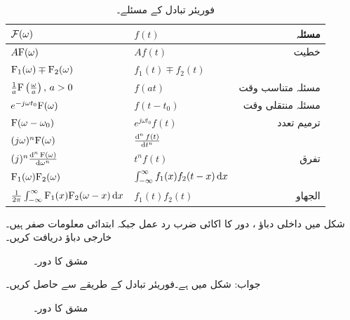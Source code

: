 \begin{table}
\caption{فوریئر تبادل کے مسئلے۔}
\label{جدول_فوریئر_بدل_مسئلے}
\centering
\begin{tabular}{l l r}
$\mathcal{F}(\omega)$ & $f(t)$ & مسئلہ \Bstrut \\ 
\hline
$A{{\textup{F}}}(\omega) $& $Af(t)$ & خطیت\Tstrut \\ [2ex]
${{\textup{F}}}_1(\omega)\mp {\ensuremath{{\textup{F}}}}_2(\omega) $& $f_1(t)\mp f_2(t)$&\\[2ex]
$\frac{1}{a}{{\textup{F}}}\left(\frac{\omega}{a}\right), \, a>0 $& $f(at)$ & مسئلہ متناسب وقت\\[2ex]
$e^{-j\omega t_0} {{\textup{F}}}(\omega)$ &$ f(t-t_0)$ & مسئلہ منتقلی وقت\\[2ex]
${{\textup{F}}}(\omega-\omega_0)$ & $e^{j\omega t_0} f(t)$ & ترمیم تعدد\\[2ex]
$(j\omega)^n {{\textup{F}}}(\omega)$ &$\frac{\dif^{\,n} f(t)}{\dif t^n}$ & \\[2ex]
$(j)^n \frac{\dif^{\, n} \bF(\omega)}{\dif \omega^n}$&$t^n f(t)$&تفرق\\[2ex]
${{\textup{F}}}_1(\omega){{\textup{F}}}_2(\omega)$ & $\int_{-\infty}^{\infty} f_1(x) f_2(t-x) \dif x$ & \\[2ex]
$\frac{1}{2\pi} \int_{-\infty}^{\infty} \bF_1(x)\bF_2(\omega-x) \dif x$&$f_1(t) f_2(t)$&الجھاو  
\end{tabular}
\end{table}

شکل  میں داخلی دباؤ ،  دور کا اکائی ضرب رد عمل  جبکہ ابتدائی معلومات صفر ہیں۔خارجی دباؤ  دریافت کریں۔
\begin{figure}
\centering
{}
\caption{مشق  کا دور۔}
\label{شکل_فوریئر_دور_کا_حل}
\end{figure}


جواب:
شکل  میں  ہے۔فوریئر تبادل کے طریقے سے  حاصل کریں۔
\begin{figure}
\centering
{}
\caption{مشق  کا دور۔}
\label{شکل_فوریئر_دور_کا_حل_ب}
\end{figure}

